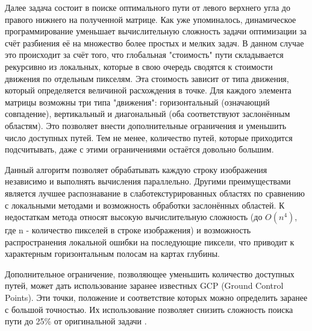 Далее задача состоит в поиске оптимального пути от левого верхнего угла до правого нижнего на полученной матрице. Как уже упоминалось, динамическое программирование уменьшает 
вычислительную сложность задачи оптимизации  за счёт разбиения её на множество более простых и мелких задач. В данном случае это происходит за счёт того, что глобальная "стоимость" пути 
складывается рекурсивно из локальных, которые в свою очередь сводятся к стоимости движения по отдельным пикселям. Эта стоимость зависит от типа движения, который определяется величиной расхождения
в точке. Для каждого элемента матрицы возможны три типа "движения": горизонтальный (означающий совпадение), вертикальный и диагональный (оба соответствуют заслонённым областям). 
Это позволяет внести дополнительные ограничения и уменьшить число доступных путей. Тем не менее, количество путей, которые приходится подсчитывать, даже с этими ограничениями 
 остаётся довольно большим.

Данный алгоритм позволяет обрабатывать каждую строку изображения независимо и выполнять вычисления параллельно. Другими преимуществами является лучшее распознавание в слаботекстурированных 
областях по сравнению с локальными методами и возможность обработки заслонённых областей.   %
К недостаткам метода относят высокую вычислительную сложность (до $O(n^4)$, где n - количество пикселей в строке изображения) и возможность распространения локальной ошибки на последующие пиксели, что приводит к характерным горизонтальным полосам на картах глубины. 

Дополнительное ограничение, позволяющее уменьшить количество доступных путей, может дать использование заранее известных GCP (Ground Control Points). Эти точки, положение и 
соответствие которых можно определить заранее с большой точностью. Их использование позволяет снизить сложность поиска пути до 25\% от оригинальной задачи \cite{DSI}. 

